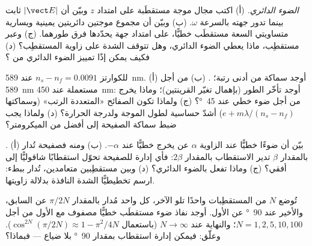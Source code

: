 \begin{exercise}[$\star\star$]\label{exo:b2:plane-waves-polarization:5}
\emph{الضوء الدائري.} (أ) اكتب مجال موجة مستقطَبة  على امتداد $z$ وبيّن أن $|\vect E|$ ثابت بينما تدور جهته
بالسرعة $\omega$. (ب) وبيّن أن مجموع موجتين دائريتين يمينية ويسارية
متساويتي السعة مستقطَب خطيًّا، على امتداد جهة يحدّدها
فرق طورهما. (ج) وعبر مستقطِب، ماذا يعطي الضوء الدائري،
وهل تتوقف الشدة على زاوية المستقطِب؟ (د) فكيف يمكن إذًا تمييز الضوء
الدائري من ؟
\end{exercise}

\begin{exercise}[$\star\star$]\label{exo:b2:plane-waves-polarization:6}
للكوارتز $n_s - n_f = 0.0091$ عند \qty{589}{nm}. (أ) أوجد سماكة
 من أدنى رتبة؛ . (ب)  من أجل \qty{589}{nm} مستعملة عند \qty{450}{nm}: أوجد تأخّر الطور
(بإهمال تغيّر القرينتين)؛ وماذا يخرج من أجل ضوء خطي
عند \qty{45}{\degree}؟ (ج) ولماذا تكون الصفائح «المتعددة الرتب» (وسماكتها $e +
m\lambda/(n_s - n_f)$) أشدّ حساسية لطول الموجة ولدرجة الحرارة؟ (د) ولماذا
يجب ضبط سماكة الصفيحة إلى أفضل من الميكرومتر؟
\end{exercise}

\begin{exercise}[$\star\star$]\label{exo:b2:plane-waves-polarization:7}
. (أ) بيّن أن ضوءًا خطيًّا عند الزاوية $\alpha$ عن
 يخرج خطيًّا عند $-\alpha$. (ب) ومنه فصفيحة تُدار بالمقدار $\beta$
تدير الاستقطاب بالمقدار $2\beta$: فأي إدارة للصفيحة تحوّل
استقطابًا شاقوليًّا إلى أفقي؟ (ج) وماذا تفعل 
بالضوء الدائري؟ (د) وبين مستقطِبين متعامدين، تُدار 
ببطء: ارسم تخطيطيًّا الشدة النافذة بدلالة زاويتها.
\end{exercise}

\begin{exercise}[$\star\star$]\label{exo:b2:plane-waves-polarization:8}
تُوضع $N$ من المستقطِبات واحدًا تلو الآخر، كل واحد مُدار بالمقدار
$\pi/2N$ عن السابق، والأخير عند \qty{90}{\degree} عن
الأول. أوجد نفاذ ضوء مستقطَب خطيًّا مصفوف مع الأول
من أجل $N = 1, 2, 5, 10, 100$؛ والنهاية عند $N \to \infty$ (باستعمال $\cos^{2N}(\pi/2N) \approx
1 - \pi^2/4N$). وعلّق: فيمكن إدارة استقطاب بمقدار \qty{90}{\degree}
بلا ضياع --- فبماذا؟
\end{exercise}

